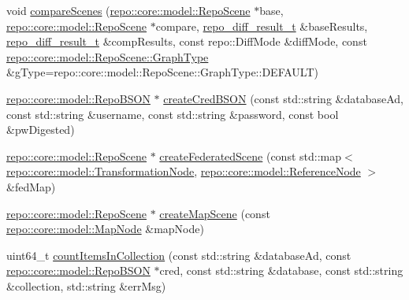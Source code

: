\begin{DoxyCompactItemize}
\item 
void \hyperlink{classrepo_1_1manipulator_1_1_repo_manipulator_abc5131e039d15e0e935269202512b921}{compare\+Scenes} (\hyperlink{classrepo_1_1core_1_1model_1_1_repo_scene}{repo\+::core\+::model\+::\+Repo\+Scene} $\ast$base, \hyperlink{classrepo_1_1core_1_1model_1_1_repo_scene}{repo\+::core\+::model\+::\+Repo\+Scene} $\ast$compare, \hyperlink{structrepo__diff__result__t}{repo\+\_\+diff\+\_\+result\+\_\+t} \&base\+Results, \hyperlink{structrepo__diff__result__t}{repo\+\_\+diff\+\_\+result\+\_\+t} \&comp\+Results, const repo\+::\+Diff\+Mode \&diff\+Mode, const \hyperlink{classrepo_1_1core_1_1model_1_1_repo_scene_aefcacd6eb4c7774ac1bfe3a6b223337c}{repo\+::core\+::model\+::\+Repo\+Scene\+::\+Graph\+Type} \&g\+Type=repo\+::core\+::model\+::\+Repo\+Scene\+::\+Graph\+Type\+::\+D\+E\+F\+A\+U\+L\+T)
\item 
\hyperlink{classrepo_1_1core_1_1model_1_1_repo_b_s_o_n}{repo\+::core\+::model\+::\+Repo\+B\+S\+O\+N} $\ast$ \hyperlink{classrepo_1_1manipulator_1_1_repo_manipulator_abc1ece0dc5c222664c716c01b5cf9f7c}{create\+Cred\+B\+S\+O\+N} (const std\+::string \&database\+Ad, const std\+::string \&username, const std\+::string \&password, const bool \&pw\+Digested)
\item 
\hyperlink{classrepo_1_1core_1_1model_1_1_repo_scene}{repo\+::core\+::model\+::\+Repo\+Scene} $\ast$ \hyperlink{classrepo_1_1manipulator_1_1_repo_manipulator_a604630a3c0926f5971a305fcd42454dd}{create\+Federated\+Scene} (const std\+::map$<$ \hyperlink{classrepo_1_1core_1_1model_1_1_transformation_node}{repo\+::core\+::model\+::\+Transformation\+Node}, \hyperlink{classrepo_1_1core_1_1model_1_1_reference_node}{repo\+::core\+::model\+::\+Reference\+Node} $>$ \&fed\+Map)
\item 
\hyperlink{classrepo_1_1core_1_1model_1_1_repo_scene}{repo\+::core\+::model\+::\+Repo\+Scene} $\ast$ \hyperlink{classrepo_1_1manipulator_1_1_repo_manipulator_a93d82f484d5b61e611d2594a208b255c}{create\+Map\+Scene} (const \hyperlink{classrepo_1_1core_1_1model_1_1_map_node}{repo\+::core\+::model\+::\+Map\+Node} \&map\+Node)
\item 
uint64\+\_\+t \hyperlink{classrepo_1_1manipulator_1_1_repo_manipulator_a1c0f152c45ee4c91ae3bd2ce12e8b79a}{count\+Items\+In\+Collection} (const std\+::string \&database\+Ad, const \hyperlink{classrepo_1_1core_1_1model_1_1_repo_b_s_o_n}{repo\+::core\+::model\+::\+Repo\+B\+S\+O\+N} $\ast$cred, const std\+::string \&database, const std\+::string \&collection, std\+::string \&err\+Msg)
\item 

\end{DoxyCompactItemize}
